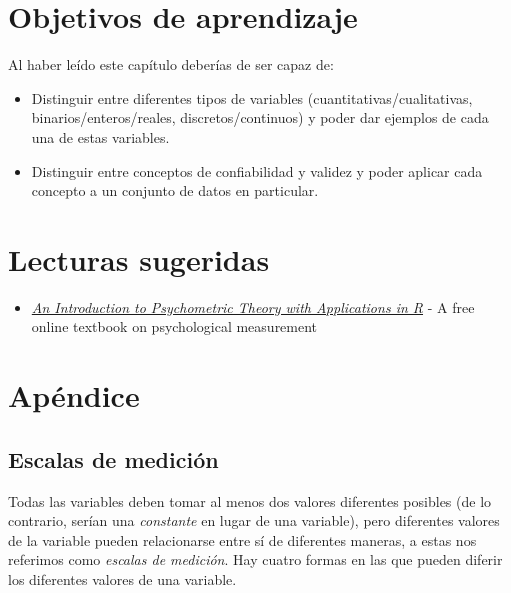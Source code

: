 \documentclass[
  12pt,
]{book}
\providecommand{\tightlist}{%
  \setlength{\itemsep}{0pt}\setlength{\parskip}{0pt}}
\begin{document}
\hypertarget{objetivos-de-aprendizaje-1}{%
\section{Objetivos de aprendizaje}\label{objetivos-de-aprendizaje-1}}

Al haber leído este capítulo deberías de ser capaz de:

\begin{itemize}
\tightlist
\item
  Distinguir entre diferentes tipos de variables (cuantitativas/cualitativas, binarios/enteros/reales, discretos/continuos) y poder dar ejemplos de cada una de estas variables.
\item
  Distinguir entre conceptos de confiabilidad y validez y poder aplicar cada concepto a un conjunto de datos en particular.
\end{itemize}

\hypertarget{lecturas-sugeridas-1}{%
\section{Lecturas sugeridas}\label{lecturas-sugeridas-1}}

\begin{itemize}
\tightlist
\item
  \href{http://www.personality-project.org/r/book/}{\emph{An Introduction to Psychometric Theory with Applications in R}} - A free online textbook on psychological measurement
\end{itemize}

\hypertarget{apuxe9ndice}{%
\section{Apéndice}\label{apuxe9ndice}}

\hypertarget{escalas-de-mediciuxf3n}{%
\subsection{Escalas de medición}\label{escalas-de-mediciuxf3n}}

Todas las variables deben tomar al menos dos valores diferentes posibles (de lo contrario, serían una \emph{constante} en lugar de una variable), pero diferentes valores de la variable pueden relacionarse entre sí de diferentes maneras, a estas nos referimos como \emph{escalas de medición}. Hay cuatro formas en las que pueden diferir los diferentes valores de una variable.
\end{document}

